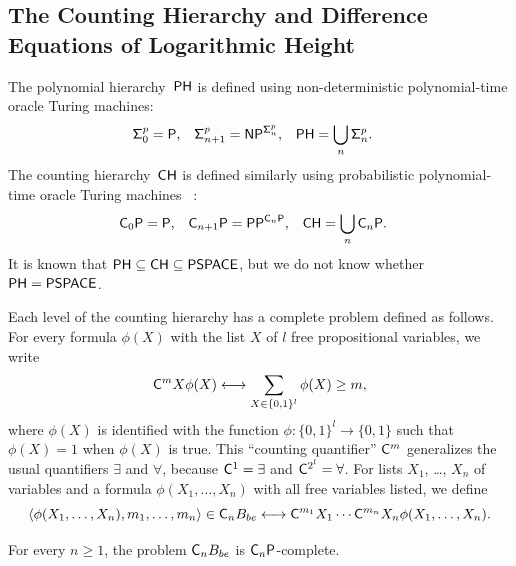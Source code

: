 \subsection{The Counting Hierarchy and Difference Equations of Logarithmic Height}
\label{subsection: counting hierarchy}

The polynomial hierarchy~$\mathsf{PH}$ is defined using non-deterministic polynomial-time oracle Turing machines: 
\begin{align}
 \mathsf{\Sigma}^p_0  &= \mathsf{P},
 &
 \mathsf{\Sigma}^p_{n+1} &= \mathsf{NP} ^{\mathsf{\Sigma}^p_n},
 &
 \mathsf{PH} &= \bigcup_n \mathsf{\Sigma}^p_n.
\end{align}
The counting hierarchy~$\mathsf{CH}$
is defined similarly
using probabilistic polynomial-time oracle Turing machines~%
\cite{wagner1986complexity,toran1991complexity}: 
\begin{align} \label{eq:CH}
 \mathsf{C}_0 \mathsf{P}  &= \mathsf{P},
 &
 \mathsf{C}_{n+1} \mathsf{P} &= \mathsf{PP}^{\mathsf{C}_n \mathsf{P}},
 &
 \mathsf{CH} &= \bigcup_n \mathsf{C}_n \mathsf{P}.
\end{align}
It is known that $\mathsf{PH} \subseteq \mathsf{CH} \subseteq \mathsf{PSPACE}$, 
but we do not know whether $\mathsf{PH} = \mathsf{PSPACE}$.


Each level of the counting hierarchy 
has a complete problem defined as follows.
For every formula $\phi(X)$ with the list $X$ of $l$ free propositional variables,
we write 
\begin{equation}
 \mathsf{C}^m X \phi(X) 
  \longleftrightarrow 
  \sum_{X \in \{0,1\}^l} \phi(X) \ge m,
\end{equation}
where $\phi(X)$ is identified with the function 
$\phi \colon \{0,1\}^l \to \{0,1\}$
such that $\phi(X) = 1$ when $\phi(X)$ is true.
This ``counting quantifier'' $\mathsf{C} ^m$ generalizes 
the usual quantifiers $\exists$ and $\forall$, 
because $\mathsf{C}^1 = \exists$ and $\mathsf{C}^{2^l} = \forall$.
For lists $X _1$, \ldots, $X _n$ of variables 
and a formula $\phi(X_1, \dots, X_n)$ with all free variables listed, 
we define
\begin{equation}
 \langle \phi(X_1, \dots, X_n), m_1, \dots, m_n \rangle \in \mathsf{C}_n B_{be}
 \longleftrightarrow
 \mathsf{C}^{m_1}{X_1} \cdots \mathsf{C}^{m_n}{X_n} \phi(X_1, \dots, X_n).
\end{equation}

\begin{lemma} \label{lemma:CnP-complete}
 For every $n \ge 1$, 
 the problem $\mathsf{C}_n B_{be}$ is $\mathsf{C}_n\mathsf{P}$-complete.
\end{lemma}

